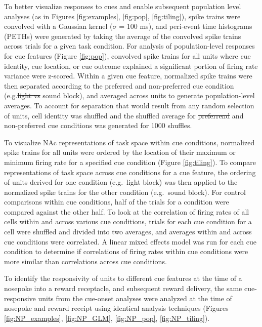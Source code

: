 \documentclass[11pt]{article}
\providecommand{\DIFadd}[1]{{\protect\color{blue}\uwave{#1}}} %
\providecommand{\DIFdel}[1]{{\protect\color{red}\sout{#1}}}                      %
\providecommand{\DIFaddbegin}{} %
\providecommand{\DIFaddend}{} %
\providecommand{\DIFdelbegin}{} %
\providecommand{\DIFdelend}{} %
\newcommand{\DIFscaledelfig}{0.5}
\newlength{\DIFdelgraphicswidth} %
\newlength{\DIFdelgraphicsheight} %
\newcommand{\DIFaddincludegraphics}[2][]{{\color{blue}\fbox{\DIFOincludegraphics[#1]{#2}}}} %
\newcommand{\DIFdelincludegraphics}[2][]{%
\sbox{\DIFdelgraphicsbox}{\DIFOincludegraphics[#1]{#2}}%
\settoboxwidth{\DIFdelgraphicswidth}{\DIFdelgraphicsbox} %
\settoboxtotalheight{\DIFdelgraphicsheight}{\DIFdelgraphicsbox} %
\scalebox{\DIFscaledelfig}{%
\parbox[b]{\DIFdelgraphicswidth}{\usebox{\DIFdelgraphicsbox}\\[-\baselineskip] \rule{\DIFdelgraphicswidth}{0em}}\llap{\resizebox{\DIFdelgraphicswidth}{\DIFdelgraphicsheight}{%
\setlength{\unitlength}{\DIFdelgraphicswidth}%
\begin{picture}(1,1)%
\thicklines\linethickness{2pt} %
{\color[rgb]{1,0,0}\put(0,0){\framebox(1,1){}}}%
{\color[rgb]{1,0,0}\put(0,0){\line( 1,1){1}}}%
{\color[rgb]{1,0,0}\put(0,1){\line(1,-1){1}}}%
\end{picture}%
}\hspace*{3pt}}} %
} %
\DeclareRobustCommand{\DIFaddbegin}{\DIFOaddbegin \let\includegraphics\DIFaddincludegraphics} %
\DeclareRobustCommand{\DIFaddend}{\DIFOaddend \let\includegraphics\DIFOincludegraphics} %
\DeclareRobustCommand{\DIFdelbegin}{\DIFOdelbegin \let\includegraphics\DIFdelincludegraphics} %
\DeclareRobustCommand{\DIFdelend}{\DIFOaddend \let\includegraphics\DIFOincludegraphics} %
\begin{document}
{To better visualize responses to cues and enable subsequent population level
analyses (as in Figures \ref{fig:examples}, \ref{fig:pop}, \DIFaddbegin \DIFadd{and
}\DIFaddend \ref{fig:tiling}), spike trains were convolved with a Gaussian kernel ($\sigma$
= 100 ms), and peri-event time histograms (PETHs) were generated by taking the
average of the convolved spike trains across trials for a given task
condition. For analysis of population-level responses for cue features (Figure
\ref{fig:pop}), convolved spike trains for all units where cue identity, cue
location, or cue outcome explained a significant portion of firing rate variance
were z-scored. Within a given cue feature, normalized spike trains were then
separated according to the preferred and non-preferred cue condition
(e.g.\DIFdelbegin \DIFdel{light vs }\DIFdelend \DIFaddbegin \DIFadd{\ light vs.\ }\DIFaddend sound block), and averaged across units to generate
population-level averages. To account for separation that would result from any
random selection of units, cell identity was shuffled and the shuffled average
for \DIFdelbegin \DIFdel{preferrend }\DIFdelend \DIFaddbegin \DIFadd{preferred }\DIFaddend and non-preferred cue conditions was generated for 1000 shuffles.

To visualize NAc representations of task space within cue conditions, normalized
spike trains for all units were ordered by the location of their maximum or
minimum firing rate for a specified cue condition (Figure \ref{fig:tiling}). To
compare representations of task space across cue conditions for a cue feature,
the ordering of units derived for one condition (e.g.\ light block) was then
applied to the normalized spike trains for the other condition (e.g.\ sound
block). For control comparisons within cue conditions, half of the trials for a
condition were compared against the other half. To look at the correlation of
firing rates of all cells within and across various cue conditions, trials for
each cue condition for a cell were shuffled and divided into two averages, and
averages within and across cue conditions were correlated. A linear mixed
effects model was run for each cue condition to determine if correlations of
firing rates within cue conditions were more similar than correlations across
cue conditions.

To identify the responsivity of units to different cue features at the time of a
nosepoke into a reward receptacle, and subsequent reward delivery, the same
cue-responsive units from the cue-onset analyses were analyzed at the time of
nosepoke and reward receipt using identical analysis techniques (Figures
\ref{fig:NP_examples}, \ref{fig:NP_GLM}, \ref{fig:NP_pop}, \DIFaddbegin \DIFadd{and
}\DIFaddend \ref{fig:NP_tiling}).

}
\end{document}
